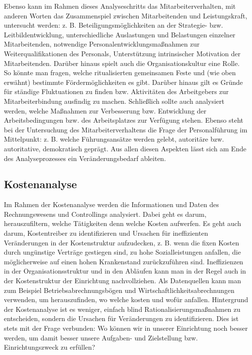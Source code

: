 \documentclass[
  letterpaper,
]{book}
\begin{document}
Ebenso kann im Rahmen dieses Analyseschritts das Mitarbeiterverhalten,
mit anderen Worten das Zusammenspiel zwischen Mitarbeitenden und
Leistungskraft, untersucht werden: z. B. Beteiligungsmöglichkeiten an
der Strategie- bzw. Leitbildentwicklung, unterschiedliche Auslastungen
und Belastungen einzelner Mitarbeitenden, notwendige
Personalentwicklungsmaßnahmen zur Weiterqualifikationen des Personals,
Unterstützung intrinsischer Motivation der Mitarbeitenden. Darüber
hinaus spielt auch die Organisationskultur eine Rolle. So könnte man
fragen, welche ritualisierten gemeinsamen Feste und (wie oben erwähnt)
bestimmte Fördermöglichkeiten es gibt. Darüber hinaus gilt es Gründe für
ständige Fluktuationen zu finden bzw. Aktivitäten des Arbeitgebers zur
Mitarbeiterbindung ausfindig zu machen. Schließlich sollte auch
analysiert werden, welche Maßnahmen zur Verbesserung bzw. Entwicklung
der Arbeitsbedingungen bzw. des Arbeitsplatzes zur Verfügung stehen.
Ebenso steht bei der Untersuchung des Mitarbeiterverhaltens die Frage
der Personalführung im Mittelpunkt: z. B. welche Führungsansätze werden
gelebt, autoritäre bzw. autoritative, demokratisch geprägt. Aus allen
diesen Aspekten lässt sich am Ende des Analyseprozesses ein
Veränderungsbedarf ableiten.

\subsection{Kostenanalyse}\label{kostenanalyse}

Im Rahmen der Kostenanalyse werden die Informationen und Daten des
Rechnungswesens und Controllings analysiert. Dabei geht es darum,
herauszufiltern, welche Tätigkeiten denn welche Kosten aufwerfen. Es
geht auch darum, Kostentreiber zu identifizieren und Ursachen für
ineffizienten Veränderungen in der Kostenstruktur aufzudecken, z. B.
wenn die fixen Kosten durch ungünstige Verträge gestiegen sind, zu hohe
Sozialleistungen anfallen, die möglicherweise auf einen hohen
Krankenstand zurückzuführen sind. Ineffizienzen in der
Organisationsstruktur und in den Abläufen kann man in der Regel auch in
der Kostenstruktur der Einrichtung nachvollziehen. Als Datenquellen kann
man zum Beispiel Betriebsabrechnungsbögen und
Wirtschaftlichkeitsabrechnungen verwenden, um herauszufinden, wo welche
kosten und wofür anfallen. Hintergrund der Kostenanalyse ist es weniger,
einfach blind Rationalisierungsmaßnahmen zu entscheiden, sondern die
Ursachen für Veränderungen zu identifizieren. Dies ist stets mit der
Frage verbunden: Wo können wir in unserer Einrichtung noch besser
werden, um damit besser unsere Aufgaben- und Zielstellung bzw.
Einrichtungszweck zu erfüllen?
\end{document}
